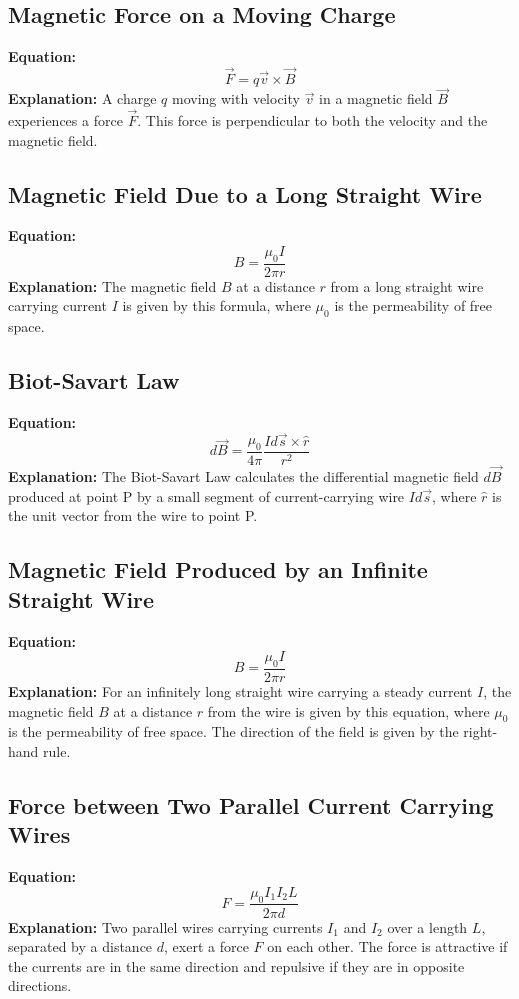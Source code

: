 \documentclass{article}
\begin{document}
\subsection*{Magnetic Force on a Moving Charge}
\textbf{Equation:} 
\[ \vec{F} = q\vec{v} \times \vec{B} \]
\textbf{Explanation:} 
A charge \( q \) moving with velocity \( \vec{v} \) in a magnetic field \( \vec{B} \) experiences a force \( \vec{F} \). This force is perpendicular to both the velocity and the magnetic field.

\subsection*{Magnetic Field Due to a Long Straight Wire}
\textbf{Equation:} 
\[ B = \frac{\mu_0 I}{2\pi r} \]
\textbf{Explanation:} 
The magnetic field \( B \) at a distance \( r \) from a long straight wire carrying current \( I \) is given by this formula, where \( \mu_0 \) is the permeability of free space.

\subsection*{Biot-Savart Law}
\textbf{Equation:} 
\[ d\vec{B} = \frac{\mu_0}{4\pi} \frac{Id\vec{s} \times \hat{r}}{r^2} \]
\textbf{Explanation:} 
The Biot-Savart Law calculates the differential magnetic field \( d\vec{B} \) produced at point P by a small segment of current-carrying wire \( Id\vec{s} \), where \( \hat{r} \) is the unit vector from the wire to point P.
\subsection*{Magnetic Field Produced by an Infinite Straight Wire}
\textbf{Equation:} 
\[ B = \frac{\mu_0 I}{2\pi r} \]
\textbf{Explanation:} 
For an infinitely long straight wire carrying a steady current \(I\), the magnetic field \(B\) at a distance \(r\) from the wire is given by this equation, where \(\mu_0\) is the permeability of free space. The direction of the field is given by the right-hand rule.

\subsection*{Force between Two Parallel Current Carrying Wires}
\textbf{Equation:} 
\[ F = \frac{\mu_0 I_1 I_2 L}{2\pi d} \]
\textbf{Explanation:} 
Two parallel wires carrying currents \(I_1\) and \(I_2\) over a length \(L\), separated by a distance \(d\), exert a force \(F\) on each other. The force is attractive if the currents are in the same direction and repulsive if they are in opposite directions.
\end{document}
